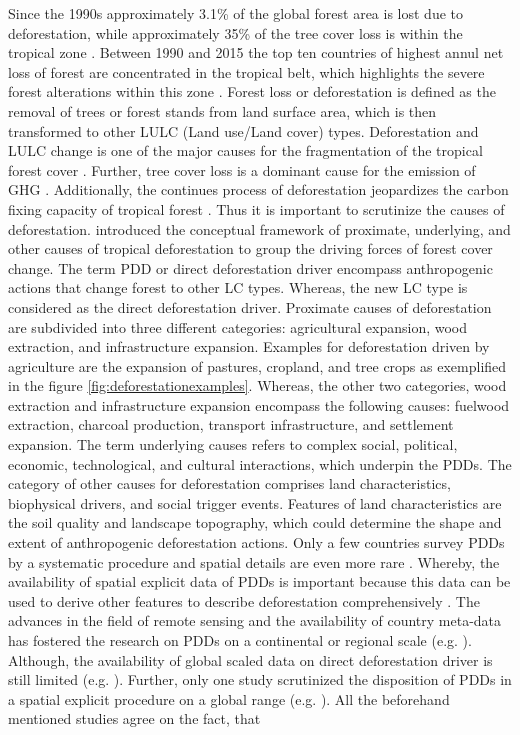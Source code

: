 	Since the 1990s approximately 3.1\% of the global forest area is lost due to deforestation, while approximately 35\% of the tree cover loss is within the tropical zone \citep{FAO2016}. Between 1990 and 2015 the top ten countries of highest annul net loss of forest are concentrated in the tropical belt, which highlights the severe forest alterations within this zone \citep{FAO2010,FAO2016}. Forest loss or deforestation is defined as the removal of trees or forest stands from land surface area, which is then transformed to other LULC (Land use/Land cover) types. Deforestation and LULC change is one of the major causes for the fragmentation of the tropical forest cover \citep{Taubert2018}. Further, tree cover loss is a dominant cause for the emission of \ac{GHG} \citep{Don2010,Baccini2012}. Additionally, the continues process of deforestation jeopardizes the carbon fixing capacity of tropical forest \citep{Baccini2017}. Thus it is important to scrutinize the causes of deforestation. \citet{Geist2001} introduced the conceptual framework of proximate, underlying, and other causes of tropical deforestation to group the driving forces of forest cover change. The term \ac{PDD} or direct deforestation driver encompass anthropogenic actions that change forest to other \ac{LC} types. Whereas, the new \ac{LC} type is considered as the direct deforestation driver. Proximate causes of deforestation are subdivided into three different categories: agricultural expansion, wood extraction, and infrastructure expansion. Examples for deforestation driven by agriculture are the expansion of pastures, cropland, and tree crops as exemplified in the figure \ref{fig:deforestationexamples}. Whereas, the other two categories, wood extraction and infrastructure expansion encompass the following causes: fuelwood extraction, charcoal production, transport infrastructure, and settlement expansion. The term underlying causes refers to complex social, political, economic, technological, and cultural interactions, which underpin the \acp{PDD}. The category of other causes for deforestation comprises land characteristics, biophysical drivers, and social trigger events. Features of land characteristics are the soil quality and landscape topography, which could determine the shape and extent of anthropogenic deforestation actions. Only a few countries survey \acp{PDD} by a systematic procedure and spatial details are even more rare \citep{Sy2015,Hosonuma2012}. Whereby, the availability of spatial explicit data of \acp{PDD} is important because this data can be used to derive other features to describe deforestation comprehensively \citep{Hosonuma2012}. The advances in the field of remote sensing and the availability of country meta-data has fostered the research on \acp{PDD} on a continental or regional scale (e.g. \citet{Sy2015,Austin2019,Zalles2018,Meyfroidt2013,Caldas2013,Graesser2015,Ruf2014,Connette2016,Barima2016,Furumo2017,Vijay2018}). Although, the availability of global scaled data on direct deforestation driver is still limited (e.g. \citet{Curtis2018,Hosonuma2012,Geist2002,DeFries2010,Carter2018}). Further, only one study scrutinized the disposition of \acp{PDD} in a spatial explicit procedure on a global range (e.g. \citet{Curtis2018}). All the beforehand mentioned studies agree on the fact, that 